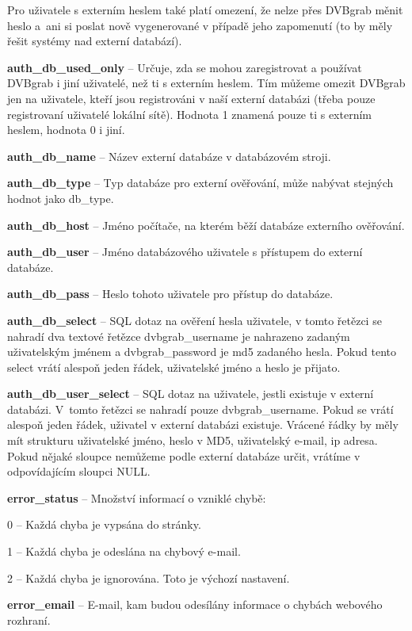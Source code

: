 Pro uživatele s externím heslem také platí omezení, že nelze přes DVBgrab měnit heslo a~ani si poslat nově vygenerované v případě jeho zapomenutí (to by měly řešit systémy nad externí databází).
\item\textbf{auth\_db\_used\_only} -- Určuje, zda se mohou zaregistrovat a používat DVBgrab i jiní uživatelé, než ti s externím heslem. Tím můžeme omezit DVBgrab jen na uživatele, kteří jsou registrováni v naší externí databázi (třeba pouze registrovaní uživatelé lokální sítě). Hodnota 1 znamená pouze ti s externím heslem, hodnota 0 i jiní.
\item\textbf{auth\_db\_name} -- Název externí databáze v databázovém stroji.
\item\textbf{auth\_db\_type} -- Typ databáze pro externí ověřování, může nabývat stejných hodnot jako db\_type.
\item\textbf{auth\_db\_host} -- Jméno počítače, na kterém běží databáze externího ověřování.
\item\textbf{auth\_db\_user} -- Jméno databázového uživatele s přístupem do externí databáze.
\item\textbf{auth\_db\_pass} -- Heslo tohoto uživatele pro přístup do databáze.
\item\textbf{auth\_db\_select} -- SQL dotaz na ověření hesla uživatele, v tomto řetězci se nahradí dva textové řetězce dvbgrab\_username je nahrazeno zadaným uživatelským jménem \linebreak[4] a dvbgrab\_password je md5 zadaného hesla. Pokud tento select vrátí alespoň jeden řádek, uživatelské jméno a heslo je přijato.
\item\textbf{auth\_db\_user\_select} -- SQL dotaz na uživatele, jestli existuje v externí databázi. V~tomto řetězci se nahradí pouze dvbgrab\_username. Pokud se vrátí alespoň jeden řádek, uživatel v externí databázi existuje. Vrácené řádky by měly mít strukturu uživatelské jméno, heslo v MD5, uživatelský e-mail, ip adresa. Pokud nějaké sloupce nemůžeme podle externí databáze určit, vrátíme v odpovídajícím sloupci NULL.
\item\textbf{error\_status} -- Množství informací o vzniklé chybě:
\bitem
\item 0 -- Každá chyba je vypsána do stránky.
\item 1 -- Každá chyba je odeslána na chybový e-mail.
\item 2 -- Každá chyba je ignorována. Toto je výchozí nastavení.
\eitem
\item\textbf{error\_email} -- E-mail, kam budou odesílány informace o chybách webového rozhraní.
